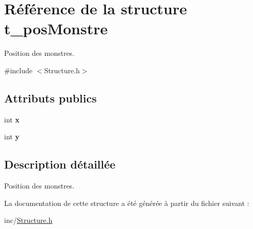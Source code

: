 \hypertarget{structt__posMonstre}{}\section{Référence de la structure t\+\_\+pos\+Monstre}
\label{structt__posMonstre}


Position des monstres.  




{\ttfamily \#include $<$Structure.\+h$>$}

\subsection*{Attributs publics}
\begin{DoxyCompactItemize}
\item 
\hypertarget{structt__posMonstre_a260e31fd52054fc4d9c480a8bdaa5a84}{}int {\bfseries x}\label{structt__posMonstre_a260e31fd52054fc4d9c480a8bdaa5a84}

\item 
\hypertarget{structt__posMonstre_a176ba315a26d69f8308497d968c71a00}{}int {\bfseries y}\label{structt__posMonstre_a176ba315a26d69f8308497d968c71a00}

\end{DoxyCompactItemize}


\subsection{Description détaillée}
Position des monstres. 

La documentation de cette structure a été générée à partir du fichier suivant \+:\begin{DoxyCompactItemize}
\item 
inc/\hyperlink{Structure_8h}{Structure.\+h}\end{DoxyCompactItemize}
